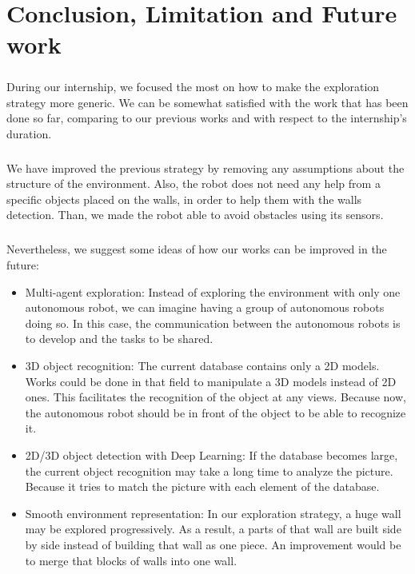 \documentclass[12pt]{report}
\begin{document}
	
	
	\chapter*{Conclusion, Limitation and Future work}
	\paragraph{}
	During our internship, we focused the most on how to make the exploration strategy more generic. We can be somewhat satisfied with the work that has been done so far, comparing to our previous works and with respect to the internship's duration.
    
    \paragraph{}
    We have improved the previous strategy by removing any assumptions about the structure of the environment. Also, the robot does not need any help from a specific objects placed on the walls, in order to help them with the walls detection. Than, we made the robot able to avoid obstacles using its sensors.
	\paragraph{}
	Nevertheless, we suggest some ideas of how our works can be improved in the future:
	\begin{itemize}
		\item Multi-agent exploration: Instead of exploring the environment with only one autonomous robot, we can imagine having a group of autonomous robots doing so. In this case, the communication between the autonomous robots is to develop and the tasks to be shared.
		\item 3D object recognition: The current database contains only a 2D models. Works could be done in that field to manipulate a 3D models instead of 2D ones. This facilitates the recognition of the object at any views. Because now, the autonomous robot should be in front of the object to be able to recognize it.
		\item 2D/3D object detection with Deep Learning: If the database becomes large, the current object recognition may take a long time to analyze the picture. Because it tries to match the picture with each element of the database.
		\item Smooth environment representation: In our exploration strategy, a huge wall may be explored progressively. As a result, a parts of that wall are built side by side instead of building that wall as one piece. An improvement would be to merge that blocks of walls into one wall.
		
	\end{itemize}
\end{document}

